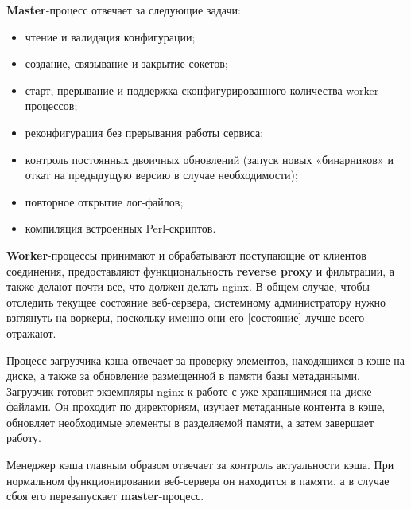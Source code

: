 \documentclass[14pt, a4paper]{article}
\begin{document}
\textbf{Master}-процесс отвечает за следующие задачи:
\begin{itemize}
    \item чтение и валидация конфигурации;
    \item создание, связывание и закрытие сокетов;
    \item старт, прерывание и поддержка сконфигурированного количества worker-процессов;
    \item реконфигурация без прерывания работы сервиса;
    \item контроль постоянных двоичных обновлений (запуск новых «бинарников» и откат на предыдущую версию 
    в случае необходимости);
    \item повторное открытие лог-файлов;
    \item компиляция встроенных Perl-скриптов.
\end{itemize}
\begin{figure}[H]%
    \centering
    \label{1.2}
\end{figure}
\textbf{Worker}-процессы принимают и обрабатывают поступающие от клиентов соединения, предоставляют 
функциональность \textbf{reverse proxy} и фильтрации, а также делают почти все, что должен делать nginx. 
В общем случае, чтобы отследить текущее состояние веб-сервера, системному администратору нужно 
взглянуть на воркеры, поскольку именно они его [состояние] лучше всего отражают.

Процесс загрузчика кэша отвечает за проверку элементов, находящихся в кэше на диске, а 
также за обновление размещенной в памяти базы метаданными. Загрузчик готовит экземпляры 
nginx к работе с уже хранящимися на диске файлами. Он проходит по директориям, изучает 
метаданные контента в кэше, обновляет необходимые элементы в разделяемой памяти, а затем завершает работу.

Менеджер кэша главным образом отвечает за контроль актуальности кэша. При нормальном 
функционировании веб-сервера он находится в памяти, а в случае сбоя его перезапускает \textbf{master}-процесс.
\end{document}
